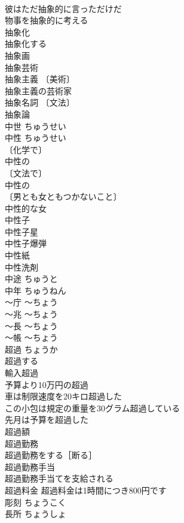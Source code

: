 \documentclass[8pt]{extreport}
\begin{document}
\begin{CJK}{UTF8}{min}
\\	彼はただ抽象的に言っただけだ 
\\	物事を抽象的に考える 
\\	抽象化 
\\	抽象化する 
\\	抽象画 
\\	抽象芸術 
\\	抽象主義 〔美術〕
\\	抽象主義の芸術家 
\\	抽象名詞 〔文法〕
\\	抽象論 
\\	中世	ちゅうせい	
\\	中性	ちゅうせい	
\\	〔化学で〕
\\	中性の 
\\	〔文法で〕
\\	中性の 
\\	〔男とも女ともつかないこと〕
\\	中性的な女 
\\	中性子 
\\	中性子星 
\\	中性子爆弾 
\\	中性紙 
\\	中性洗剤 
\\	中途	ちゅうと	
\\	中年	ちゅうねん	
\\	～庁	～ちょう	
\\	～兆	～ちょう	
\\	～長	～ちょう	
\\	～帳	～ちょう	
\\	超過	ちょうか	
\\	超過する 
\\	輸入超過 
\\	予算より10万円の超過 
\\	車は制限速度を20キロ超過した 
\\	この小包は規定の重量を30グラム超過している 
\\	先月は予算を超過した 
\\	超過額 
\\	超過勤務 
\\	超過勤務をする［断る］ 
\\	超過勤務手当 
\\	超過勤務手当てを支給される 
\\	超過料金 超過料金は1時間につき800円です 
\\	彫刻	ちょうこく	
\\	長所	ちょうしょ	

\end{CJK}
\end{document}
